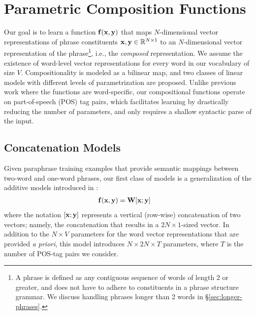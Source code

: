\documentclass[11pt,letterpaper]{article}
\newcommand{\bX}{{\bf x}}
\newcommand{\bY}{{\bf y}}
\newcommand{\bF}{{\bf f}}
\newcommand{\bW}{{\bf W}}
\begin{document}
\section{Parametric Composition Functions}
\label{sec:learning}

Our goal is to learn a function $\bF (\bX, \bY)$ that maps $N$-dimensional vector representations of phrase constituents $\bX, \bY \in \mathbb{R}^{N \times 1}$  to an $N$-dimensional vector representation of the phrase\footnote{A phrase is defined as any contiguous sequence of words of length 2 or greater, and does not have to adhere to constituents in a phrase structure grammar. We discuss handling phrases longer than 2 words in \S\ref{sec:longer-phrases}.}, i.e., the \emph{composed} representation. 
We assume the existence of word-level vector representations for every word in our vocabulary of size $V$.
Compositionality is modeled as a bilinear map, and two classes of linear models with different levels of parametrization are proposed.  
Unlike previous work \cite[\emph{inter alia}]{Baroni2010,Socher2012,Grefenstette2013} where the functions are  word-specific, our compositional functions operate on part-of-speech (POS) tag pairs, which facilitates learning by drastically reducing the number of parameters, and only requires a shallow syntactic parse of the input. 

\subsection{Concatenation Models}
\label{sec:concat}

Given paraphrase training examples that provide semantic mappings between two-word and one-word phrases, our first class of models is a generalization of the additive models introduced in :
\begin{align}
	\bF (\bX, \bY) &= \bW [\bX;\bY]
	\label{eq:concat}
\end{align}
where the notation $[\bX; \bY]$ represents a vertical (row-wise) concatenation of two vectors; namely, the concatenation that results in a $2N \times 1$-sized vector.  
In addition to the $N \times V$ parameters for the word vector representations that are provided \emph{a priori}, this model introduces $N \times 2N \times T$ parameters, where $T$ is the number of POS-tag pairs we consider.  
\end{document}
